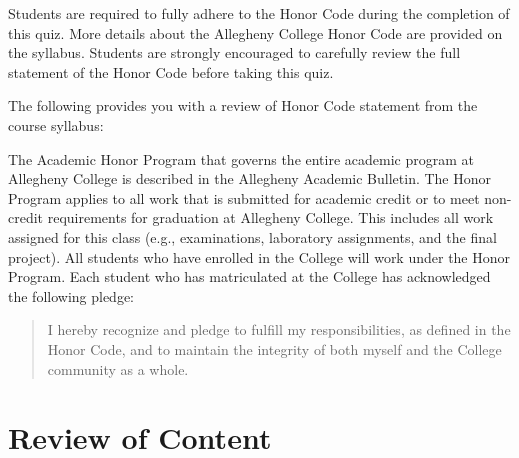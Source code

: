\noindent Students are required to fully adhere to the Honor Code during the completion of this quiz. More details about
the Allegheny College Honor Code are provided on the syllabus. Students are strongly encouraged to carefully review the
full statement of the Honor Code before taking this quiz.

\noindent The following provides you with a review of Honor Code statement from the course syllabus:

The Academic Honor Program that governs the entire academic program at Allegheny College is described in the Allegheny
Academic Bulletin.  The Honor Program applies to all work that is submitted for academic credit or to meet non-credit
requirements for graduation at Allegheny College.  This includes all work assigned for this class (e.g., examinations,
  laboratory assignments, and the final project).  All students who have enrolled in the College will work under the Honor
Program.  Each student who has matriculated at the College has acknowledged the following pledge:

\vspace*{-.11in}
\begin{quote}
  I hereby recognize and pledge to fulfill my responsibilities, as defined in the Honor Code, and to maintain the
  integrity of both myself and the College community as a whole.
\end{quote}
\vspace*{-.11in}


\vspace*{-.1in}
\section*{Review of Content}
\vspace*{-.05in}

